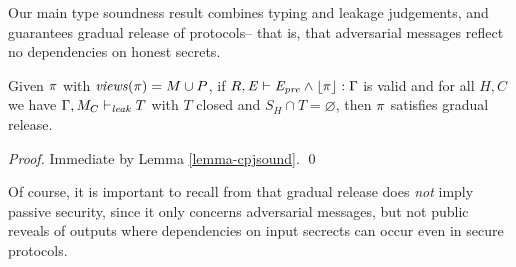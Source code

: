 Our main type soundness result combines typing and leakage judgements,
and guarantees gradual release of protocols-- that is, that adversarial
messages reflect no dependencies on honest secrets.
\begin{theorem}
  \label{theorem-cpj}
  Given $\pi$ with $\mathit{views}(\pi) = M \cup P$, if $R,\mathit{E} \vdash \mathit{E}_{\mathit{pre}} \wedge \lfloor \pi \rfloor : \Gamma$
  is valid and for all $H,C$ we have $\Gamma,M_C \vdash_{\mathit{leak}} T$ with $T$ closed
  and $S_H \cap T = \varnothing$, then $\pi$ satisfies gradual release.
\end{theorem}
\begin{proof}
  Immediate by Lemma \ref{lemma-cpjsound}. \qed
\end{proof}

\leakjfig

Of course, it is important to recall from \cite{skalka-near-ppdp24}
that gradual release does \emph{not} imply passive security, since it
only concerns adversarial messages, but not public reveals of outputs
where dependencies on input secrects can occur even in secure
protocols.

\begin{comment}
\subsection{Examples}

\begin{verbatimtab}
m[s1]@2 := (s[1] - r[local] - r[x])@1
m[s1]@3 := r[x]@1

// m[s1]@2 : { c(r[x]@1, { c(r[local]@1, {s[1]@1} ) }
// m[s1]@3 : { r[x]@1 }
\end{verbatimtab}

\begin{verbatimtab}
m[x]@1 := s2(s[x],-r[x],r[x])@2

// m[x]@1 == s[x]@2 + -r[x]@2 
// m[x]@1 : { c(r[x]@2, { s[x]@2 }) } 

m[y]@1 := OT(s[y]@1,-r[y],r[y])@2

// m[y]@1 == s[y]@1 + -r[y]@2
// m[y]@1 : { c(r[y]@2, { s[y]@1 }) } 
\end{verbatimtab}
\end{comment}
